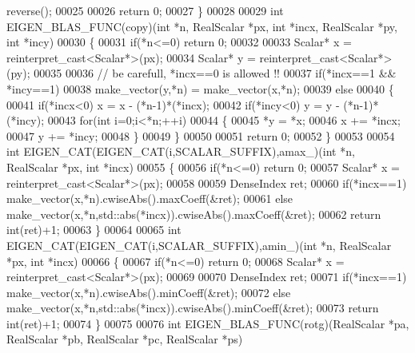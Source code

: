 \begin{DoxyCode}
      reverse();
00025 
00026   \textcolor{keywordflow}{return} 0;
00027 \}
00028 
00029 \textcolor{keywordtype}{int} EIGEN\_BLAS\_FUNC(copy)(\textcolor{keywordtype}{int} *n, RealScalar *px, \textcolor{keywordtype}{int} *incx, RealScalar *py, \textcolor{keywordtype}{int} *incy)
00030 \{
00031   \textcolor{keywordflow}{if}(*n<=0) \textcolor{keywordflow}{return} 0;
00032 
00033   Scalar* x = \textcolor{keyword}{reinterpret\_cast<}Scalar*\textcolor{keyword}{>}(px);
00034   Scalar* y = \textcolor{keyword}{reinterpret\_cast<}Scalar*\textcolor{keyword}{>}(py);
00035 
00036   \textcolor{comment}{// be carefull, *incx==0 is allowed !!}
00037   \textcolor{keywordflow}{if}(*incx==1 && *incy==1)
00038     make\_vector(y,*n) = make\_vector(x,*n);
00039   \textcolor{keywordflow}{else}
00040   \{
00041     \textcolor{keywordflow}{if}(*incx<0) x = x - (*n-1)*(*incx);
00042     \textcolor{keywordflow}{if}(*incy<0) y = y - (*n-1)*(*incy);
00043     \textcolor{keywordflow}{for}(\textcolor{keywordtype}{int} i=0;i<*n;++i)
00044     \{
00045       *y = *x;
00046       x += *incx;
00047       y += *incy;
00048     \}
00049   \}
00050 
00051   \textcolor{keywordflow}{return} 0;
00052 \}
00053 
00054 \textcolor{keywordtype}{int} EIGEN\_CAT(EIGEN\_CAT(i,SCALAR\_SUFFIX),amax\_)(\textcolor{keywordtype}{int} *n, RealScalar *px, \textcolor{keywordtype}{int} *incx)
00055 \{
00056   \textcolor{keywordflow}{if}(*n<=0) \textcolor{keywordflow}{return} 0;
00057   Scalar* x = \textcolor{keyword}{reinterpret\_cast<}Scalar*\textcolor{keyword}{>}(px);
00058 
00059   DenseIndex ret;
00060   \textcolor{keywordflow}{if}(*incx==1)  make\_vector(x,*n).cwiseAbs().maxCoeff(&ret);
00061   \textcolor{keywordflow}{else}          make\_vector(x,*n,std::abs(*incx)).cwiseAbs().maxCoeff(&ret);
00062   \textcolor{keywordflow}{return} int(ret)+1;
00063 \}
00064 
00065 \textcolor{keywordtype}{int} EIGEN\_CAT(EIGEN\_CAT(i,SCALAR\_SUFFIX),amin\_)(\textcolor{keywordtype}{int} *n, RealScalar *px, \textcolor{keywordtype}{int} *incx)
00066 \{
00067   \textcolor{keywordflow}{if}(*n<=0) \textcolor{keywordflow}{return} 0;
00068   Scalar* x = \textcolor{keyword}{reinterpret\_cast<}Scalar*\textcolor{keyword}{>}(px);
00069 
00070   DenseIndex ret;
00071   \textcolor{keywordflow}{if}(*incx==1)  make\_vector(x,*n).cwiseAbs().minCoeff(&ret);
00072   \textcolor{keywordflow}{else}          make\_vector(x,*n,std::abs(*incx)).cwiseAbs().minCoeff(&ret);
00073   \textcolor{keywordflow}{return} int(ret)+1;
00074 \}
00075 
00076 \textcolor{keywordtype}{int} EIGEN\_BLAS\_FUNC(rotg)(RealScalar *pa, RealScalar *pb, RealScalar *pc, RealScalar *ps)

\end{DoxyCode}
